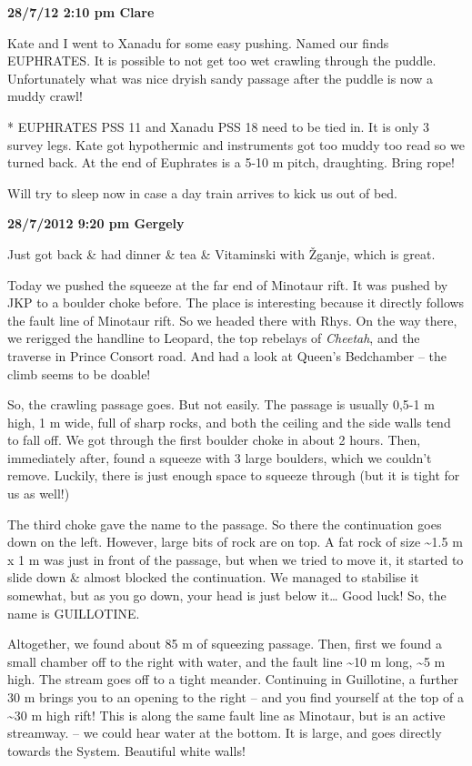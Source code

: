 \textbf{28/7/12 2:10 pm Clare}

Kate and I went to Xanadu for some easy pushing. Named our finds
EUPHRATES. It is possible to not get too wet crawling through the
puddle. Unfortunately what was nice dryish sandy passage after the
puddle is now a muddy crawl!

* EUPHRATES PSS 11 and Xanadu PSS 18 need to be tied in. It is only 3
survey legs. Kate got hypothermic and instruments got too muddy too read
so we turned back. At the end of Euphrates is a 5-10 m pitch,
draughting. Bring rope!

Will try to sleep now in case a day train arrives to kick us out of bed.

\textbf{28/7/2012 9:20 pm Gergely}

Just got back \& had dinner \& tea \& Vitaminski with Žganje, which is
great.

Today we pushed the squeeze at the far end of Minotaur rift. It was
pushed by JKP to a boulder choke before. The place is interesting
because it directly follows the fault line of Minotaur rift. So we
headed there with Rhys. On the way there, we rerigged the handline to
Leopard, the top rebelays of \emph{Cheetah}, and the traverse in Prince
Consort road. And had a look at Queen's Bedchamber -- the climb seems to
be doable!

So, the crawling passage goes. But not easily. The passage is usually
0,5-1 m high, 1 m wide, full of sharp rocks, and both the ceiling and
the side walls tend to fall off. We got through the first boulder choke
in about 2 hours. Then, immediately after, found a squeeze with 3 large
boulders, which we couldn't remove. Luckily, there is just enough space
to squeeze through (but it is tight for us as well!)

The third choke gave the name to the passage. So there the continuation
goes down on the left. However, large bits of rock are on top. A fat
rock of size \textasciitilde 1.5 m x 1 m was just in front of the
passage, but when we tried to move it, it started to slide down \&
almost blocked the continuation. We managed to stabilise it somewhat,
but as you go down, your head is just below it\ldots{} Good luck! So,
the name is GUILLOTINE.

Altogether, we found about 85 m of squeezing passage. Then, first we
found a small chamber off to the right with water, and the fault line
\textasciitilde 10 m long, \textasciitilde 5 m high. The stream goes off
to a tight meander. Continuing in Guillotine, a further 30 m brings you
to an opening to the right -- and you find yourself at the top of a
\textasciitilde 30 m high rift! This is along the same fault line as
Minotaur, but is an active streamway. -- we could hear water at the
bottom. It is large, and goes directly towards the System. Beautiful
white walls!

